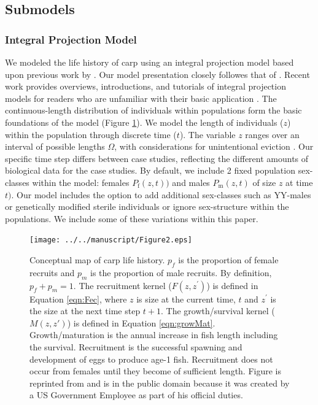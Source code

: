 \documentclass{article}[12pt]
\begin{document}
\subsection{Submodels}\label{sec:submdl}

\subsubsection{Integral Projection Model}

We modeled the life history of carp using an integral projection model based upon previous work by \citet{Erickson:2017ecomod}. 
Our model  presentation closely followes that of \citet{Erickson:2017ecomod}.
Recent work provides overviews, introductions, and tutorials of integral projection models for readers who are unfamiliar with their basic application \citep[e.g.,][]{ellner2006integral, ramula2009integral, Ellner:2010IPM, merow2014advancing}.
The continuous-length distribution of individuals within populations form the basic foundations of the model (Figure \ref{fig:cMap}).
We model the length of individuals (\(z\)) within the population through discrete time (\(t\)).
The variable \(z\) ranges over an interval of possible lengths \(\Omega\), with considerations for unintentional eviction \citep{williams2012avoiding}.
Our specific time step differs between case studies, reflecting the different amounts of biological data for the case studies.
By default, we include 2 fixed population sex-classes within the model: females \(P_\text{f}(z,t))\) and males \(P_\text{m}(z, t)\) of size \(z\) at time \(t)\). 
Our model includes the option to add additional sex-classes such as YY-males \citep{Erickson:2017ecomod} or genetically modified sterile individuals \citep{knols2006gm} or ignore sex-structure within the populations.
We include some of these variations within this paper. 


\begin{figure}[htbp]
	\centering
	\texttt{[image: ../../manuscript/Figure2.eps]} 
	   \caption{Conceptual map of carp life history. \(p_f\) is the proportion of female recruits and \(p_m\) is the proportion of male recruits. By definition, \(p_f + p_m = 1\).  The recruitment kernel (\(F(z, z^\prime)\)) is defined in Equation \ref{eqn:Fec}, where \(z\) is size at the current time, \(t\) and \(z^\prime\) is the size at the next time step \(t+1\). The growth/survival kernel (\(M (z, z')\)) is defined in Equation \ref{eqn:growMat}.  Growth/maturation is the annual increase in fish length including the survival. Recruitment is the successful spawning and development of eggs to produce age-1 fish. Recruitment does not occur from females until they become of sufficient length. Figure is reprinted from \citet{Erickson:2017ecomod}  and is in the public domain because it was created by a US Government Employee as part of his official duties.}
   \label{fig:cMap}
\end{figure}
\end{document}
